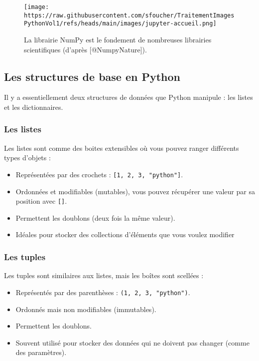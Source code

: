 \documentclass[11pt]{article}
\begin{document}
\begin{figure}
\hypertarget{fig-jupyterlab}{%
\centering
\texttt{[image: https://raw.githubusercontent.com/sfoucher/TraitementImagesPythonVol1/refs/heads/main/images/jupyter-accueil.png]}
\caption{La librairie NumPy est le fondement de nombreuses librairies
scientifiques (d'après {[}@NumpyNature{]}).}\label{fig-jupyterlab}
}
\end{figure}

\hypertarget{les-structures-de-base-en-python}{%
\subsection{Les structures de base en
Python}\label{les-structures-de-base-en-python}}

Il y a essentiellement deux structures de données que Python manipule :
les listes et les dictionnaires.

\hypertarget{les-listes}{%
\subsubsection{Les listes}\label{les-listes}}

Les listes sont comme des boites extensibles où vous pouvez ranger
différents types d'objets :

\begin{itemize}
\item
  Représentées par des crochets : \texttt{{[}1,\ 2,\ 3,\ "python"{]}}.
\item
  Ordonnées et modifiables (mutables), vous pouvez récupérer une valeur
  par sa position avec \texttt{{[}{]}}.
\item
  Permettent les doublons (deux fois la même valeur).
\item
  Idéales pour stocker des collections d'éléments que vous voulez
  modifier
\end{itemize}

\hypertarget{les-tuples}{%
\subsubsection{Les tuples}\label{les-tuples}}

Les tuples sont similaires aux listes, mais les boîtes sont scellées :

\begin{itemize}
\item
  Représentés par des parenthèses : \texttt{(1,\ 2,\ 3,\ "python")}.
\item
  Ordonnés mais non modifiables (immutables).
\item
  Permettent les doublons.
\item
  Souvent utilisé pour stocker des données qui ne doivent pas changer
  (comme des paramètres).
\end{itemize}
\end{document}
